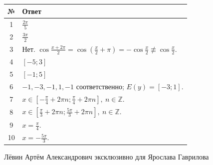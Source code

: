 \documentclass[a4paper,12pt]{article}
\begin{document}
\renewcommand{\arraystretch}{1.45}
\begin{tabularx}{\linewidth}{@{}cX@{}}
\toprule
\textbf{№} & \textbf{Ответ}\\
\midrule
1 & $\displaystyle \frac{2\pi}{5}$\\
2 & $\displaystyle \frac{3\pi}{2}$\\
3 & Нет. $\displaystyle \cos\frac{x+2\pi}{2}=\cos\left(\frac{x}{2}+\pi\right)=-\cos\frac{x}{2}\not\equiv\cos\frac{x}{2}$.\\
4 & $[-5;3]$\\
5 & $[-1;5]$\\
6 & $-1,-3,-1,1,-1$ соответственно; $E(y)=[-3;1]$.\\
7 & $\displaystyle x\in\left[-\frac\pi4+2\pi n;\frac\pi4+2\pi n\right],\ n\in\mathbb Z$.\\
8 & $\displaystyle x\in\left[\frac\pi3+2\pi n;\frac{5\pi}{3}+2\pi n\right],\ n\in\mathbb Z$.\\
9 & $\displaystyle x=\frac\pi4$.\\
10 & $\displaystyle x=-\frac{5\pi}{3}$.\\
\bottomrule
\end{tabularx}

\vfill
{\small\color{warmgray}Лёвин Артём Александрович эксклюзивно для Ярослава Гаврилова}\par
\end{document}
